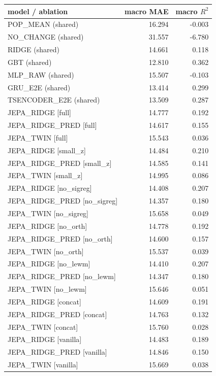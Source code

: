 \begin{tabular}{lrr}
\toprule
model / ablation & macro MAE & macro $R^2$ \\
\midrule
POP\_MEAN (shared) & 16.294 & -0.003 \\
NO\_CHANGE (shared) & 31.557 & -6.780 \\
RIDGE (shared) & 14.661 & 0.118 \\
GBT (shared) & 12.810 & 0.362 \\
MLP\_RAW (shared) & 15.507 & -0.103 \\
GRU\_E2E (shared) & 13.414 & 0.299 \\
TSENCODER\_E2E (shared) & 13.509 & 0.287 \\
\midrule
JEPA\_RIDGE [full] & 14.777 & 0.192 \\
JEPA\_RIDGE\_PRED [full] & 14.617 & 0.155 \\
JEPA\_TWIN [full] & 15.543 & 0.036 \\
JEPA\_RIDGE [small\_z] & 14.484 & 0.210 \\
JEPA\_RIDGE\_PRED [small\_z] & 14.585 & 0.141 \\
JEPA\_TWIN [small\_z] & 14.995 & 0.086 \\
JEPA\_RIDGE [no\_sigreg] & 14.408 & 0.207 \\
JEPA\_RIDGE\_PRED [no\_sigreg] & 14.357 & 0.180 \\
JEPA\_TWIN [no\_sigreg] & 15.658 & 0.049 \\
JEPA\_RIDGE [no\_orth] & 14.778 & 0.192 \\
JEPA\_RIDGE\_PRED [no\_orth] & 14.600 & 0.157 \\
JEPA\_TWIN [no\_orth] & 15.537 & 0.039 \\
JEPA\_RIDGE [no\_lewm] & 14.410 & 0.207 \\
JEPA\_RIDGE\_PRED [no\_lewm] & 14.347 & 0.180 \\
JEPA\_TWIN [no\_lewm] & 15.646 & 0.051 \\
JEPA\_RIDGE [concat] & 14.609 & 0.191 \\
JEPA\_RIDGE\_PRED [concat] & 14.763 & 0.132 \\
JEPA\_TWIN [concat] & 15.760 & 0.028 \\
JEPA\_RIDGE [vanilla] & 14.483 & 0.189 \\
JEPA\_RIDGE\_PRED [vanilla] & 14.846 & 0.150 \\
JEPA\_TWIN [vanilla] & 15.669 & 0.038 \\
\bottomrule
\end{tabular}